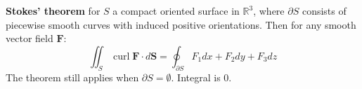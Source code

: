 \documentclass[a4paper]{article}
\newcommand{\RR}{\mathbb{R}}
\def\curl{\operatorname{curl}}
\begin{document}
\begin{multicols}{2}
	\textbf{Stokes' theorem} for $S$ a compact oriented surface in $\RR^3$, where $\partial S$ consists of piecewise smooth curves with induced positive orientations. Then for any smooth vector field $\mathbf{F}$:
	\[
		\iint_S \curl \mathbf{F}\cdot d\mathbf{S}=\oint_{\partial S}F_1dx+F_2dy+F_3dz
	\]
	The theorem still applies when $\partial S=\emptyset$. Integral is $0$.

\end{multicols}
\end{document}
